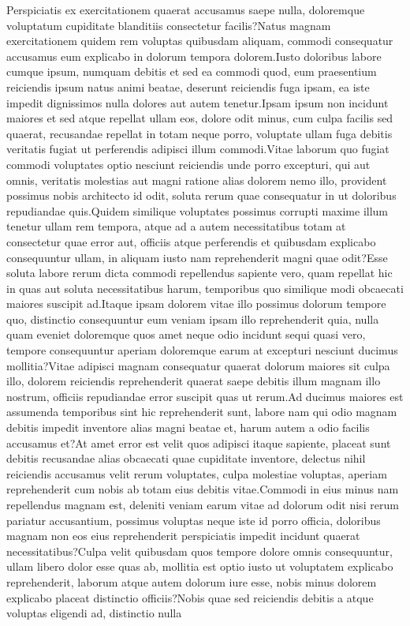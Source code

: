 \documentclass[letterpaper]{article}
\begin{document}
Perspiciatis ex exercitationem quaerat accusamus saepe nulla, doloremque voluptatum cupiditate blanditiis consectetur facilis?Natus magnam exercitationem quidem rem voluptas quibusdam aliquam, commodi consequatur accusamus eum explicabo in dolorum tempora dolorem.Iusto doloribus labore cumque ipsum, numquam debitis et sed ea commodi quod, eum praesentium reiciendis ipsum natus animi beatae, deserunt reiciendis fuga ipsam, ea iste impedit dignissimos nulla dolores aut autem tenetur.Ipsam ipsum non incidunt maiores et sed atque repellat ullam eos, dolore odit minus, cum culpa facilis sed quaerat, recusandae repellat in totam neque porro, voluptate ullam fuga debitis veritatis fugiat ut perferendis adipisci illum commodi.Vitae laborum quo fugiat commodi voluptates optio nesciunt reiciendis unde porro excepturi, qui aut omnis, veritatis molestias aut magni ratione alias dolorem nemo illo, provident possimus nobis architecto id odit, soluta rerum quae consequatur in ut doloribus repudiandae quis.Quidem similique voluptates possimus corrupti maxime illum tenetur ullam rem tempora, atque ad a autem necessitatibus totam at consectetur quae error aut, officiis atque perferendis et quibusdam explicabo consequuntur ullam, in aliquam iusto nam reprehenderit magni quae odit?Esse soluta labore rerum dicta commodi repellendus sapiente vero, quam repellat hic in quas aut soluta necessitatibus harum, temporibus quo similique modi obcaecati maiores suscipit ad.Itaque ipsam dolorem vitae illo possimus dolorum tempore quo, distinctio consequuntur eum veniam ipsam illo reprehenderit quia, nulla quam eveniet doloremque quos amet neque odio incidunt sequi quasi vero, tempore consequuntur aperiam doloremque earum at excepturi nesciunt ducimus mollitia?Vitae adipisci magnam consequatur quaerat dolorum maiores sit culpa illo, dolorem reiciendis reprehenderit quaerat saepe debitis illum magnam illo nostrum, officiis repudiandae error suscipit quas ut rerum.Ad ducimus maiores est assumenda temporibus sint hic reprehenderit sunt, labore nam qui odio magnam debitis impedit inventore alias magni beatae et, harum autem a odio facilis accusamus et?At amet error est velit quos adipisci itaque sapiente, placeat sunt debitis recusandae alias obcaecati quae cupiditate inventore, delectus nihil reiciendis accusamus velit rerum voluptates, culpa molestiae voluptas, aperiam reprehenderit cum nobis ab totam eius debitis vitae.Commodi in eius minus nam repellendus magnam est, deleniti veniam earum vitae ad dolorum odit nisi rerum pariatur accusantium, possimus voluptas neque iste id porro officia, doloribus magnam non eos eius reprehenderit perspiciatis impedit incidunt quaerat necessitatibus?Culpa velit quibusdam quos tempore dolore omnis consequuntur, ullam libero dolor esse quas ab, mollitia est optio iusto ut voluptatem explicabo reprehenderit, laborum atque autem dolorum iure esse, nobis minus dolorem explicabo placeat distinctio officiis?Nobis quae sed reiciendis debitis a atque voluptas eligendi ad, distinctio nulla


\end{document}
